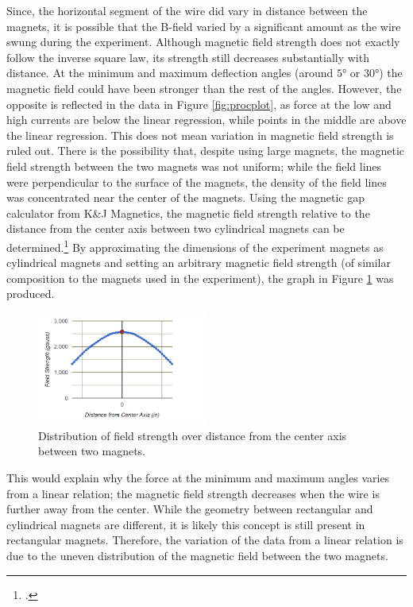 Since, the horizontal segment of the wire did vary in distance between the magnets, it is possible that the B-field varied by a significant amount as the wire swung during the experiment.
Although magnetic field strength does not exactly follow the inverse square law, its strength still decreases substantially with distance.
At the minimum and maximum deflection angles (around $5\si{\degree}$ or $30\si{\degree}$) the magnetic field could have been stronger than the rest of the angles.
However, the opposite is reflected in the data in Figure \ref{fig:procplot}, as force at the low and high currents are below the linear regression, while points in the middle are above the linear regression.
This does not mean variation in magnetic field strength is ruled out.
There is the possibility that, despite using large magnets, the magnetic field strength between the two magnets was not uniform; while the field lines were perpendicular to the surface of the magnets, the density of the field lines was concentrated near the center of the magnets.
Using the magnetic gap calculator from K{\&}J Magnetics, the magnetic field strength relative to the distance from the center axis between two cylindrical magnets can be determined.\footcite{kjgap}
By approximating the dimensions of the experiment magnets as cylindrical magnets and setting an arbitrary magnetic field strength (of similar composition to the magnets used in the experiment), the graph in Figure \ref{fig:gaps} was produced.
\begin{figure}[H]
	\centering
	\includegraphics[width=0.5\textwidth]{figures/gapplot.PNG}
	\caption{Distribution of field strength over distance from the center axis between two magnets.}
	\label{fig:gaps}
	\vspace{-1em}
\end{figure}
This would explain why the force at the minimum and maximum angles varies from a linear relation; the magnetic field strength decreases when the wire is further away from the center.
While the geometry between rectangular and cylindrical magnets are different, it is likely this concept is still present in rectangular magnets.
Therefore, the variation of the data from a linear relation is due to the uneven distribution of the magnetic field between the two magnets.

